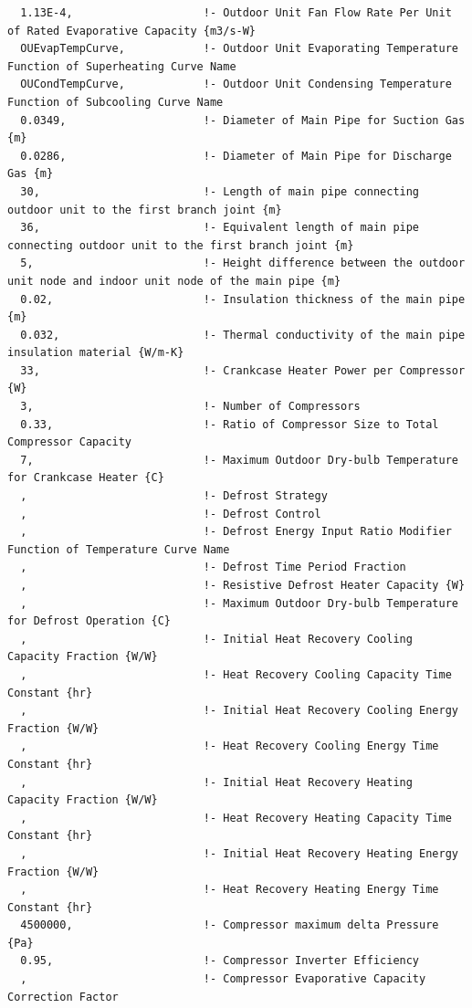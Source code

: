 \begin{lstlisting}
  1.13E-4,                    !- Outdoor Unit Fan Flow Rate Per Unit of Rated Evaporative Capacity {m3/s-W}
  OUEvapTempCurve,            !- Outdoor Unit Evaporating Temperature Function of Superheating Curve Name
  OUCondTempCurve,            !- Outdoor Unit Condensing Temperature Function of Subcooling Curve Name
  0.0349,                     !- Diameter of Main Pipe for Suction Gas {m}
  0.0286,                     !- Diameter of Main Pipe for Discharge Gas {m}
  30,                         !- Length of main pipe connecting outdoor unit to the first branch joint {m}
  36,                         !- Equivalent length of main pipe connecting outdoor unit to the first branch joint {m}
  5,                          !- Height difference between the outdoor unit node and indoor unit node of the main pipe {m}
  0.02,                       !- Insulation thickness of the main pipe {m}
  0.032,                      !- Thermal conductivity of the main pipe insulation material {W/m-K}
  33,                         !- Crankcase Heater Power per Compressor {W}
  3,                          !- Number of Compressors
  0.33,                       !- Ratio of Compressor Size to Total Compressor Capacity
  7,                          !- Maximum Outdoor Dry-bulb Temperature for Crankcase Heater {C}
  ,                           !- Defrost Strategy
  ,                           !- Defrost Control
  ,                           !- Defrost Energy Input Ratio Modifier Function of Temperature Curve Name
  ,                           !- Defrost Time Period Fraction
  ,                           !- Resistive Defrost Heater Capacity {W}
  ,                           !- Maximum Outdoor Dry-bulb Temperature for Defrost Operation {C}
  ,                           !- Initial Heat Recovery Cooling Capacity Fraction {W/W}
  ,                           !- Heat Recovery Cooling Capacity Time Constant {hr}
  ,                           !- Initial Heat Recovery Cooling Energy Fraction {W/W}
  ,                           !- Heat Recovery Cooling Energy Time Constant {hr}
  ,                           !- Initial Heat Recovery Heating Capacity Fraction {W/W}
  ,                           !- Heat Recovery Heating Capacity Time Constant {hr}
  ,                           !- Initial Heat Recovery Heating Energy Fraction {W/W}
  ,                           !- Heat Recovery Heating Energy Time Constant {hr}
  4500000,                    !- Compressor maximum delta Pressure {Pa}
  0.95,                       !- Compressor Inverter Efficiency
  ,                           !- Compressor Evaporative Capacity Correction Factor

\end{lstlisting}
